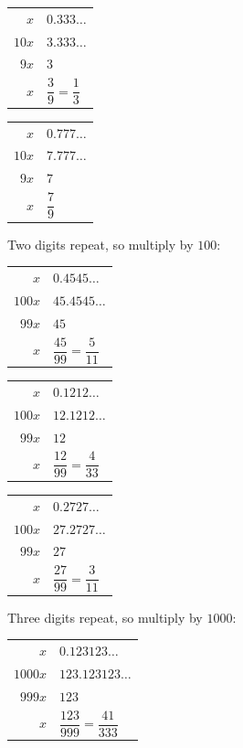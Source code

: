 \documentclass[aspectratio=169]{beamer}
\makeatletter
\newcommand{\work}[1]{%
  \begin{tabular}{@{}r@{\;=\;}l@{}}#1\end{tabular}%
}
\makeatother
\begin{document}
  {\work{$x$ & $0.333\ldots$ \\[0.2em]
         $10x$ & $3.333\ldots$ \\[0.2em]
         $9x$ & $3$ \\[0.2em]
         $x$ & $\dfrac39=\dfrac13$}}

  {\work{$x$ & $0.777\ldots$ \\[0.2em]
         $10x$ & $7.777\ldots$ \\[0.2em]
         $9x$ & $7$ \\[0.2em]
         $x$ & $\dfrac79$}}

  {Two digits repeat, so multiply by $100$:\\[0.4em]
   \work{$x$ & $0.4545\ldots$ \\[0.2em]
         $100x$ & $45.4545\ldots$ \\[0.2em]
         $99x$ & $45$ \\[0.2em]
         $x$ & $\dfrac{45}{99}=\dfrac{5}{11}$}}

  {\work{$x$ & $0.1212\ldots$ \\[0.2em]
         $100x$ & $12.1212\ldots$ \\[0.2em]
         $99x$ & $12$ \\[0.2em]
         $x$ & $\dfrac{12}{99}=\dfrac{4}{33}$}}

  {\work{$x$ & $0.2727\ldots$ \\[0.2em]
         $100x$ & $27.2727\ldots$ \\[0.2em]
         $99x$ & $27$ \\[0.2em]
         $x$ & $\dfrac{27}{99}=\dfrac{3}{11}$}}

  {Three digits repeat, so multiply by $1000$:\\[0.4em]
   \work{$x$ & $0.123123\ldots$ \\[0.2em]
         $1000x$ & $123.123123\ldots$ \\[0.2em]
         $999x$ & $123$ \\[0.2em]
         $x$ & $\dfrac{123}{999}=\dfrac{41}{333}$}}
\end{document}
